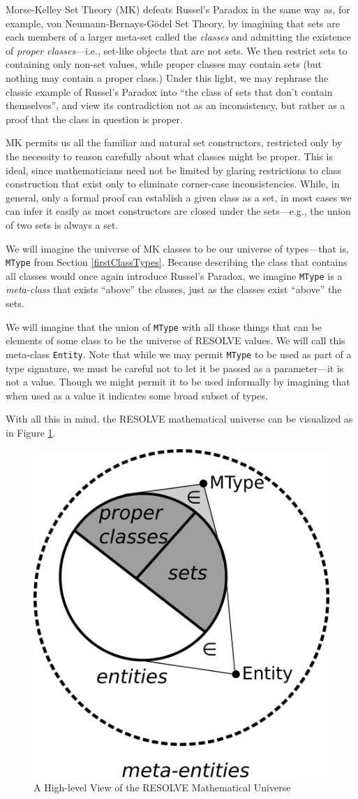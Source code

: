 Morse-Kelley Set Theory (MK) defeats Russel's Paradox in the same way as, for example, von Neumann-Bernays-G\"{o}del Set Theory, by imagining that sets are each members of a larger meta-set called the \emph{classes} and admitting the existence of \emph{proper classes}---i.e., set-like objects that are not sets.  We then restrict sets to containing only non-set values, while proper classes may contain sets (but nothing may contain a proper class.)  Under this light, we may rephrase the classic example of Russel's Paradox into ``the class of sets that don't contain themselves'', and view its contradiction not as an inconsistency, but rather as a proof that the class in question is proper.

MK permits us all the familiar and natural set constructors, restricted only by the necessity to reason carefully about what classes might be proper.  This is ideal, since mathematicians need not be limited by glaring restrictions to class construction that exist only to eliminate corner-case inconsistencies.  While, in general, only a formal proof can establish a given class as a set, in most cases we can infer it easily as most constructors are closed under the sets---e.g., the union of two sets is always a set.

We will imagine the universe of MK classes to be our universe of types---that is, \texttt{MType} from Section \ref{firstClassTypes}.  Because describing the class that contains all classes would once again introduce Russel's Paradox, we imagine \texttt{MType} is a \emph{meta-class} that exists ``above'' the classes, just as the classes exist ``above'' the sets.

We will imagine that the union of \texttt{MType} with all those things that can be elements of some class to be the universe of RESOLVE values.  We will call this meta-class \texttt{Entity}.  Note that while we may permit \texttt{MType} to be used as part of a type signature, we must be careful not to let it be passed as a parameter---it is not a value.  Though we might permit it to be used informally by imagining that when used as a value it indicates some broad subset of types.

With all this in mind, the RESOLVE mathematical universe can be visualized as in Figure \ref{fig:universe}.

\begin{figure}
  \centering
    \includegraphics[width=.33\textwidth]{universe}
  \caption{A High-level View of the RESOLVE Mathematical Universe\label{fig:universe}}
\end{figure}


